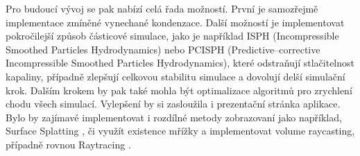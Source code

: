 Pro budoucí vývoj se pak nabízí celá řada možností. První je samozřejmě implementace zmíněné vynechané kondenzace. Další možností je implementovat pokročilejší způsob částicové simulace, jako je například ISPH (Incompressible Smoothed Particles Hydrodynamics) nebo PCISPH (Predictive–corrective Incompressible Smoothed Particles Hydrodynamics), které odstraňují stlačitelnost kapaliny, případně zlepšují celkovou stabilitu simulace a dovolují delší simulační krok. Dalším krokem by pak také mohla být optimalizace algoritmů pro zrychlení chodu všech simulací. Vylepšení by si zasloužila i prezentační stránka aplikace. Bylo by zajímavé implementovat i rozdílné metody zobrazovaní jako například, Surface Splatting \cite{surfSplat}, či využít existence mřížky a implementovat volume raycasting, případně rovnou Raytracing \cite{volumeRT}. 



